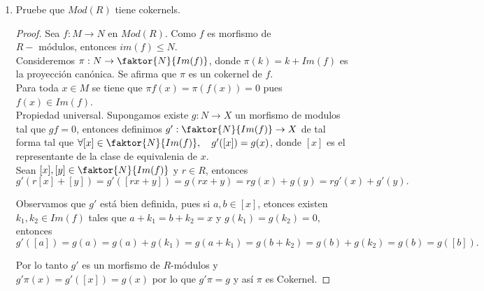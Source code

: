 \documentclass{article}
\begin{document}
\begin{enumerate}[label=\textbf{Ej \arabic*.}]
\begin{proof}
Primero demostraremos que $K\leq A$. \\

Sean $r\in R$ $a,b\in K$, entonces $f(ra+b)=rf(a)+f(b)=r\cdot 0+0=0$, por lo tanto $ra+b\in K$, entonces $K\in Mod(R)$ y $\mu$ es morfismo.\\

 Como $f\mu:K\to B$ y para toda $x\in K$ se tiene que $f\mu(x)=f(\mu(x))=f(x)=0$ entonces $f\mu=0$.\\

 Supongamos $g:X\to A$ es un morfismo tal que $fg=0$, entonces $g(x)\in K$ pues $f(g(x))=0$. Así
definimos el morfismo $h:X\to K$ tal que $h(x)=g(x)$, entonces $\mu h(x)=\mu(g(x))=g(x)$ \,\,$\forall x\in X$, por lo tanto $\mu h=g$ y así $K$ es
kernel de $f$.\\

Por lo tanto $Mod(R)$ tiene kernels.

\end{proof}

\item Pruebe que $Mod(R)$ tiene cokernels.

\begin{proof}
Sea $f:M\to N$ en $Mod(R)$. Como $f$ es morfismo de \\ $R-$ módulos, entonces $im(f)\leq N$. \\

Consideremos $\pi:N\to \faktor{N}{Im(f)}$, donde $\pi(k)=k+Im(f)$ es la proyección canónica. Se afirma que $\pi$ es un cokernel de $f$.\\

 Para toda $x\in M$ se tiene que $\pi f(x)=\pi(f(x))=0$ pues $f(x)\in Im(f)$.\\

 Propiedad universal. Supongamos existe $g:N\to X$ un morfismo de modulos tal que $gf=0$, entonces definimos 
$g':\faktor{N}{Im(f)}\to X$ de tal forma tal que $\forall [x]\in \faktor{N}{Im(f)},\quad g'([x])=g(x)$, donde $[x]$ es el representante de
la clase de equivalenia de $x$.\\

Sean $[x],[y]\in \faktor{N}{Im(f)}$ y $r\in R$, entonces 
\[g'(r[x]+[y])=g'([rx+y])=g(rx+y)=rg(x)+g(y)=rg'(x)+g'(y).\]

Observamos que $g'$ está bien definida, pues si $a,b\in [x]$, etonces existen $k_1,k_2\in Im(f)$ tales que $a+k_1=b+k_2=x$ y $g(k_1)=g(k_2)=0$,
entonces 
\[g'([a])=g(a)=g(a)+g(k_1)=g(a+k_1)=g(b+k_2)=g(b)+g(k_2)=g(b)=g([b]).\]

Por lo tanto $g'$ es un morfismo de $R$-módulos y $g'\pi(x)=g'([x])=g(x)$ por lo que $g'\pi=g$ y así $\pi$ es Cokernel.









\end{proof}








	\end{enumerate}		
\end{document}
